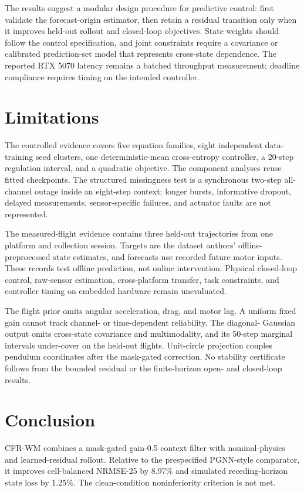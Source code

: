 \documentclass[pdflatex,sn-basic]{sn-jnl}
\newcommand{\PrimaryImprovement}{8.97}
\newcommand{\ClosedLoopImprovement}{1.25}
\begin{document}
The results suggest a modular design procedure for predictive control: first
validate the forecast-origin estimator, then retain a residual transition only
when it improves held-out rollout and closed-loop objectives. State weights
should follow the control specification, and joint constraints require a
covariance or calibrated prediction-set model that represents cross-state
dependence. The reported RTX 5070 latency remains a batched throughput
measurement; deadline compliance requires timing on the intended controller.

\section{Limitations}

The controlled evidence covers five equation families, eight independent
data-training seed clusters, one deterministic-mean cross-entropy controller,
a 20-step regulation interval, and a quadratic objective. The component
analyses reuse fitted checkpoints. The structured missingness test is a
synchronous two-step all-channel outage inside an eight-step context; longer
bursts, informative dropout, delayed measurements, sensor-specific failures,
and actuator faults are not represented.

The measured-flight evidence contains three held-out trajectories from one
platform and collection session. Targets are the dataset authors' offline-
preprocessed state estimates, and forecasts use recorded future motor inputs.
These records test offline prediction, not online intervention. Physical
closed-loop control, raw-sensor estimation, cross-platform transfer, task
constraints, and controller timing on embedded hardware remain unevaluated.

The flight prior omits angular acceleration, drag, and motor lag. A uniform
fixed gain cannot track channel- or time-dependent reliability. The diagonal-
Gaussian output omits cross-state covariance and multimodality, and its
50-step marginal intervals under-cover on the held-out flights. Unit-circle
projection couples pendulum coordinates after the mask-gated correction. No
stability certificate follows from the bounded residual or the finite-horizon
open- and closed-loop results.

\section{Conclusion}

CFR-WM combines a mask-gated gain-0.5 context filter with nominal-physics and
learned-residual rollout. Relative to the prespecified PGNN-style comparator,
it improves cell-balanced NRMSE-25 by \PrimaryImprovement\% and simulated
receding-horizon state loss by \ClosedLoopImprovement\%. The clean-condition
noninferiority criterion is not met.
\end{document}
